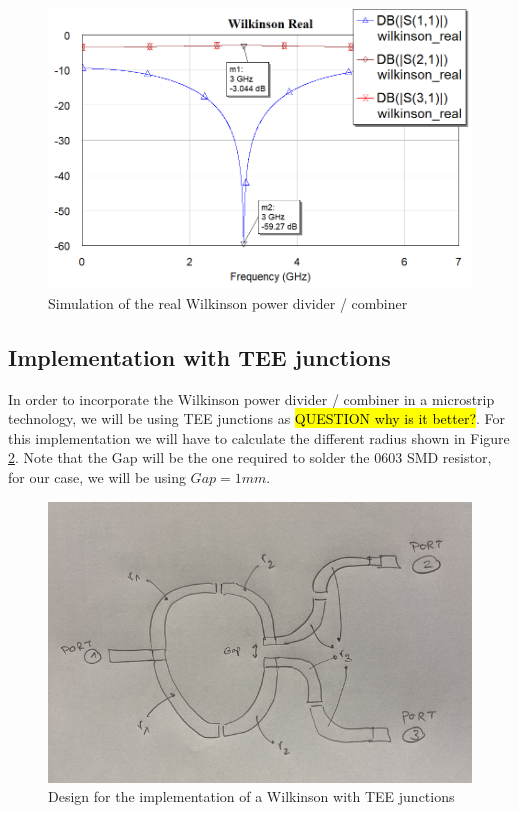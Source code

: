 \documentclass[12pt]{report} %
\newcommand{\question}[1]{\sethlcolor{red}\hl{QUESTION #1}}
\begin{document}
\begin{figure}[htbp]
    \centering
    \includegraphics[width=1\linewidth]{images//microstrip_elements/wilkinson_real_graph.png}
    \caption{Simulation of the real Wilkinson power divider / combiner}
    \label{fig:microstrip_elements:wilkinson_real_graph}
\end{figure}

\subsection{Implementation with TEE junctions}

In order to incorporate the Wilkinson power divider / combiner in a microstrip technology, we will be using TEE junctions as \question{why is it better?}. For this implementation we will have to calculate the different radius shown in Figure \ref{fig:microstrip_elements:wilkinson_tee_design}. Note that the Gap will be the one required to solder the 0603 SMD resistor, for our case, we will be using $Gap = 1 mm$.

\begin{figure}
    \centering
    \includegraphics[width=1\linewidth]{images//microstrip_elements/wilkinson_tee_design.png}
    \caption{Design for the implementation of a Wilkinson with TEE junctions}
    \label{fig:microstrip_elements:wilkinson_tee_design}
\end{figure}
\end{document}
